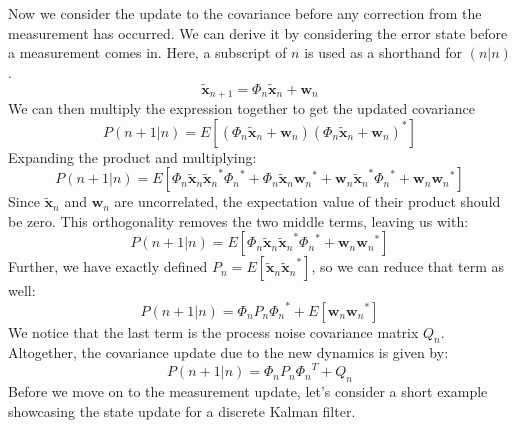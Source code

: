 Now we consider the update to the covariance before any correction from the measurement has occurred. We can derive it by considering the error state before a measurement comes in. Here, a subscript of $n$ is used as a shorthand for $(n|n)$.
$$\bm{\tilde{x}}_{n+1}=\Phi_{n}\bm{\tilde{x}}_{n}+\bm{w}_{n}$$
We can then multiply the expression together to get the updated covariance
$$P(n+1|n)=E\left[\left(\Phi_{n}\bm{\tilde{x}}_{n}+\bm{w}_{n}\right)\left(\Phi_{n}\bm{\tilde{x}}_{n}+\bm{w}_{n}\right)^*\right]$$
Expanding the product and multiplying:
$$P(n+1|n)=E\left[\Phi_{n}\bm{\tilde{x}}_{n}{\bm{\tilde{x}}_{n}}^*{\Phi_{n}}^*+\Phi_{n}\bm{\tilde{x}}_{n}{\bm{w}_{n}}^*+{\bm{w}_{n}}{\bm{\tilde{x}}_{n}}^*{\Phi_{n}}^*+\bm{w}_n{\bm{w}_n}^*\right]$$
Since $\bm{\tilde{x}}_{n}$ and $\bm{w}_n$ are uncorrelated, the expectation value of their product should be zero. This orthogonality removes the two middle terms, leaving us with:
$$P(n+1|n)=E\left[\Phi_{n}\bm{\tilde{x}}_{n}{\bm{\tilde{x}}_{n}}^*{\Phi_{n}}^*+\bm{w}_n{\bm{w}_n}^*\right]$$
Further, we have exactly defined $P_n=E\left[\bm{\tilde{x}}_n{\bm{\tilde{x}}_n}^*\right]$, so we can reduce that term as well:
$$P(n+1|n)=\Phi_{n}P_n{\Phi_{n}}^*+E\left[\bm{w}_n{\bm{w}_n}^*\right]$$
We notice that the last term is the process noise covariance matrix $Q_n$. Altogether, the covariance update due to the new dynamics is given by:
$$P(n+1|n)=\Phi_{n}P_n{\Phi_{n}}^T+Q_n$$
Before we move on to the measurement update, let's consider a short example showcasing the state update for a discrete Kalman filter.
